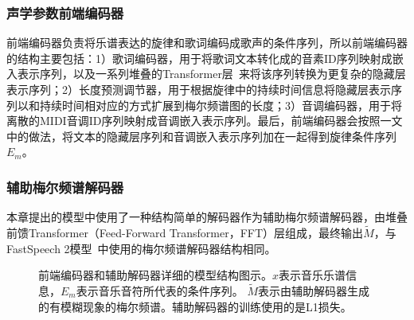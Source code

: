 \subsubsection{声学参数前端编码器}
前端编码器负责将乐谱表达的旋律和歌词编码成歌声的条件序列，所以前端编码器的结构主要包括：1）歌词编码器，用于将歌词文本转化成的音素ID序列映射成嵌入表示序列，以及一系列堆叠的Transformer层~\citep{vaswani2017attention}来将该序列转换为更复杂的隐藏层表示序列；2）长度预测调节器，用于根据旋律中的持续时间信息将隐藏层表示序列以和持续时间相对应的方式扩展到梅尔频谱图的长度；3）音调编码器，用于将离散的MIDI音调ID序列映射成音调嵌入表示序列。最后，前端编码器会按照\citet{ren2020deepsinger}一文中的做法，将文本的隐藏层序列和音调嵌入表示序列加在一起得到旋律条件序列$E_m$。
\subsubsection{辅助梅尔频谱解码器}
本章提出的模型中使用了一种结构简单的解码器作为辅助梅尔频谱解码器，由堆叠前馈Transformer（Feed-Forward Transformer，FFT）层组成，最终输出$\widetilde{M}$，与FastSpeech 2模型~\citep{ren2021fastspeech}中使用的梅尔频谱解码器结构相同。
\begin{figure}[ht]
    \centering
    \caption{前端编码器和辅助解码器详细的模型结构图示。$x$表示音乐乐谱信息，$E_m$表示音乐音符所代表的条件序列。 $\widetilde{M}$表示由辅助解码器生成的有模糊现象的梅尔频谱。辅助解码器的训练使用的是L1损失。}
    \label{supfig:encoder_auxdecoder}
\end{figure}
